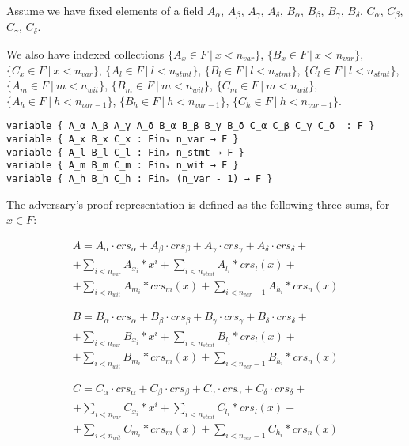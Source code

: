 \documentclass{article}
\theoremstyle{definition}
\theoremstyle{remark}
\begin{document}
Assume we have fixed elements of a field $A_{\alpha}$, $A_{\beta}$, $A_{\gamma}$, $A_{\delta}$, $B_{\alpha}$, $B_{\beta}$, $B_{\gamma}$, $B_{\delta}$, $C_{\alpha}$, $C_{\beta}$, $C_{\gamma}$, $C_{\delta}$.

We also have indexed collections $\{ A_x \in F \: | \: x < n_{var} \}$, $\{ B_x \in F \: | \: x < n_{var} \}$, $\{ C_x \in F \: | \: x < n_{var} \}$, $\{ A_l \in F \: | \: l < n_{stmt} \}$, $\{ B_l \in F \: | \: l < n_{stmt} \}$, $\{ C_l \in F \: | \: l < n_{stmt} \}$, $\{ A_m \in F \: | \: m < n_{wit} \}$, $\{ B_m \in F \: | \: m < n_{wit} \}$, $\{ C_m \in F \: | \: m < n_{wit} \}$, $\{ A_h \in F \: | \: h < n_{var - 1} \}$, $\{ B_h \in F \: | \: h < n_{var - 1} \}$, $\{ C_h \in F \: | \: h < n_{var - 1} \}$.

\begin{lstlisting}
variable { A_α A_β A_γ A_δ B_α B_β B_γ B_δ C_α C_β C_γ C_δ  : F }
variable { A_x B_x C_x : Finₓ n_var → F }
variable { A_l B_l C_l : Finₓ n_stmt → F }
variable { A_m B_m C_m : Finₓ n_wit → F }
variable { A_h B_h C_h : Finₓ (n_var - 1) → F }
\end{lstlisting}

The adversary's proof representation is defined as the following three sums, for $x \in F$:

\begin{multline}
A = A_{\alpha} \cdot crs_{\alpha} + A_{\beta} \cdot crs_{\beta} + A_{\gamma} \cdot crs_{\gamma} + A_{\delta} \cdot crs_{\delta} + \\
    + \sum \limits_{i < n_{var}} A_{x_i} * x^i + \sum \limits_{i < n_{stmt}} A_{l_i} * crs_l(x) + \\
    + \sum \limits_{i < n_{wit}} A_{m_i} * crs_m(x) + \sum \limits_{i < n_{var} - 1} A_{h_i} * crs_n(x)
\end{multline}

\begin{multline}
B = B_{\alpha} \cdot crs_{\alpha} + B_{\beta} \cdot crs_{\beta} + B_{\gamma} \cdot crs_{\gamma} + B_{\delta} \cdot crs_{\delta} + \\
    + \sum \limits_{i < n_{var}} B_{x_i} * x^i + \sum \limits_{i < n_{stmt}} B_{l_i} * crs_l(x) + \\
    + \sum \limits_{i < n_{wit}} B_{m_i} * crs_m(x) + \sum \limits_{i < n_{var} - 1} B_{h_i} * crs_n(x)
\end{multline}

\begin{multline}
C = C_{\alpha} \cdot crs_{\alpha} + C_{\beta} \cdot crs_{\beta} + C_{\gamma} \cdot crs_{\gamma} + C_{\delta} \cdot crs_{\delta} + \\
    + \sum \limits_{i < n_{var}} C_{x_i} * x^i + \sum \limits_{i < n_{stmt}} C_{l_i} * crs_l(x) + \\
    + \sum \limits_{i < n_{wit}} C_{m_i} * crs_m(x) + \sum \limits_{i < n_{var} - 1} C_{h_i} * crs_n(x)
\end{multline}
\end{document}
